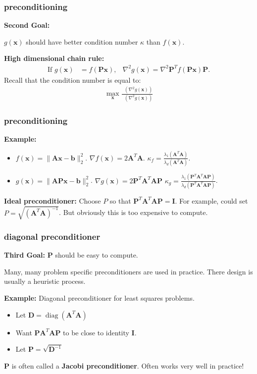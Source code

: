 \documentclass[compress]{beamer}
\newcommand{\bv}[1]{\mathbf{#1}}
\DeclareMathOperator{\diag}{diag}
\DeclareMathOperator*{\lmin}{\lambda_{min}}
\DeclareMathOperator*{\lmax}{\lambda_{max}}
\begin{document}
\begin{frame}[t]
	\frametitle{preconditioning}
	\textbf{Second Goal:} 
	
	$g(\bv{x})$ should have better condition number $\kappa$ than $f(\bv{x})$. 
	
	
	\textbf{High dimensional chain rule:}
	\begin{align*}
		\text{If } g(\bv{x}) &= f(\bv{Px}), & \nabla^2 g(\bv{x}) = \nabla^2 \bv{P}^Tf(\bv{P}\bv{x})\bv{P}.
	\end{align*}
	Recall that the condition number is equal to:
	\begin{align*}
		\max_\bv{x} \frac{\lmax\left(\nabla^2 g(\bv{x})\right)}{\lmin\left(\nabla^2 g(\bv{x})\right)}
	\end{align*}
\end{frame}

\begin{frame}[t]
	\frametitle{preconditioning}
	\textbf{Example:} 
	\begin{itemize}
		\item $f(\bv{x}) = \|\bv{A}\bv{x} - \bv{b}\|_2^2$. $\nabla f(\bv{x}) = 2\bv{A}^T\bv{A}$. $\kappa_f =\frac{\lambda_1(\bv{A}^T\bv{A})}{\lambda_d(\bv{A}^T\bv{A})}$.
		\item $g(\bv{x}) = \|\bv{A}\bv{P}\bv{x} - \bv{b}\|_2^2$. $\nabla g(\bv{x}) = 2\bv{P}^T\bv{A}^T\bv{A}\bv{P}$ $\kappa_g =\frac{\lambda_1(\bv{P}^T\bv{A}^T\bv{A}\bv{P})}{\lambda_d(\bv{P}^T\bv{A}^T\bv{A}\bv{P})}$.
	\end{itemize}
	
	\textbf{Ideal preconditioner:} Choose $P$ so that  $\bv{P}^T\bv{A}^T\bv{A}\bv{P} = \bv{I}$. For example, could set $P = \sqrt{(\bv{A}^T\bv{A})^{-1}}$. But obviously this is too expensive to compute.
\end{frame}

\begin{frame}[t]
	\frametitle{diagonal preconditioner}
	\textbf{Third Goal:} $\bv{P}$ should be easy to compute.
	
	\begin{center}
		\alert{Many, many problem specific preconditioners are used in practice. There design is usually a heuristic process.} 
	\end{center}
	
	\textbf{Example:} Diagonal preconditioner for least squares problems. 
	\begin{itemize}
		\item Let $\bv{D} = \diag(\bv{A}^T\bv{A})$
		\item Want $\bv{PA}^T\bv{AP}$ to be close to identity $\bv{I}$.
		\item Let $\bv{P} = \sqrt{\bv{D}^{-1}}$
	\end{itemize}
	$\bv{P}$ is often called a \alert{\textbf{Jacobi preconditioner}}. Often works very well in practice!
\end{frame}
\end{document}
